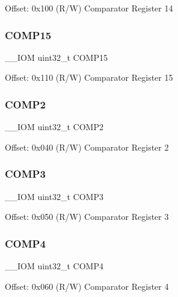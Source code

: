 Offset\+: 0x100 (R/W) Comparator Register 14 \mbox{\label{struct_d_w_t___type_ae55e0087f992cfd56003fc3fe1394cb0}} 
\subsubsection{\texorpdfstring{COMP15}{COMP15}}
{\footnotesize\ttfamily \+\_\+\+\_\+\+I\+OM uint32\+\_\+t C\+O\+M\+P15}

Offset\+: 0x110 (R/W) Comparator Register 15 \mbox{\label{struct_d_w_t___type_aeeb1e36001c60a167399683280d6ec39}} 
\subsubsection{\texorpdfstring{COMP2}{COMP2}}
{\footnotesize\ttfamily \+\_\+\+\_\+\+I\+OM uint32\+\_\+t C\+O\+M\+P2}

Offset\+: 0x040 (R/W) Comparator Register 2 \mbox{\label{struct_d_w_t___type_a20b0b62a3576ee88db4a7c065cd988ac}} 
\subsubsection{\texorpdfstring{COMP3}{COMP3}}
{\footnotesize\ttfamily \+\_\+\+\_\+\+I\+OM uint32\+\_\+t C\+O\+M\+P3}

Offset\+: 0x050 (R/W) Comparator Register 3 \mbox{\label{struct_d_w_t___type_a8ea52ce87f7d0225db1b5ba91313f4b7}} 
\subsubsection{\texorpdfstring{COMP4}{COMP4}}
{\footnotesize\ttfamily \+\_\+\+\_\+\+I\+OM uint32\+\_\+t C\+O\+M\+P4}

Offset\+: 0x060 (R/W) Comparator Register 4 \mbox{\label{struct_d_w_t___type_a290e024c0b0f35317de6363a4135c3bc}} 
